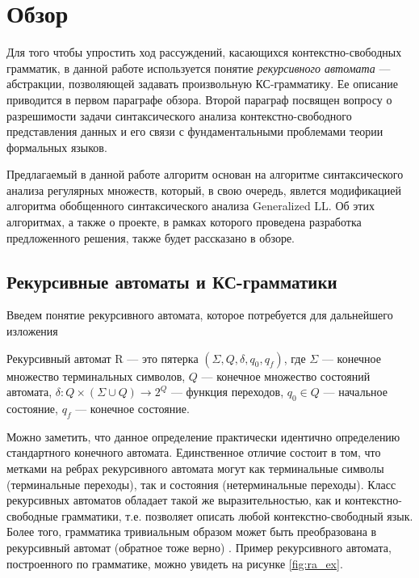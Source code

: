 \section{Обзор}

Для того чтобы упростить ход рассуждений, касающихся контекстно-свободных грамматик, в данной работе используется понятие \textit{рекурсивного автомата} --- абстракции, позволяющей задавать произвольную КС-грамматику.
Ее описание приводится в первом параграфе обзора. 
Второй параграф посвящен вопросу о разрешимости задачи синтаксического анализа контекстно-свободного представления данных и его связи с фундаментальными проблемами теории формальных языков.

Предлагаемый в данной работе алгоритм основан на алгоритме синтаксического анализа регулярных множеств, который, в свою очередь, явлется модификацией алгоритма обобщенного синтаксического анализа Generalized LL. 
Об этих алгоритмах, а также о проекте, в рамках которого проведена разработка предложенного решения, также будет рассказано в обзоре.

\subsection{Рекурсивные автоматы и КС-грамматики}
Введем понятие рекурсивного автомата, которое потребуется для дальнейшего изложения

\begin{defn}
	Рекурсивный автомат R --- это пятерка $(\Sigma, Q, \delta, q_0, q_f)$, где $\Sigma$ --- конечное множество терминальных символов, $Q$ --- конечное множество состояний автомата, $\delta : Q \times (\Sigma \cup Q) \rightarrow 2^Q$ --- функция переходов, $q_0 \in Q$ --- начальное состояние, $q_f$ --- конечное состояние. 
\end{defn}

Можно заметить, что данное определение практически идентично определению стандартного конечного автомата. 
Единственное отличие состоит в том, что метками на ребрах рекурсивного автомата могут как терминальные символы (терминальные переходы), так и состояния (нетерминальные переходы).
Класс рекурсивных автоматов обладает такой же выразительностью, как и контекстно-свободные грамматики, т.е. позволяет описать любой контекстно-свободный язык. 
Более того, грамматика тривиальным образом может быть преобразована в рекурсивный автомат (обратное тоже верно) \cite{tellier2006ra}. 
Пример рекурсивного автомата, построенного по грамматике, можно увидеть на рисунке \ref{fig:ra_ex}.

